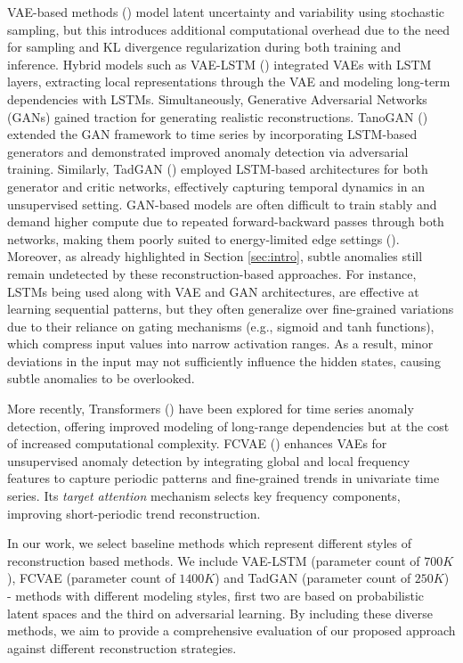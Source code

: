 VAE-based methods (\cite{vae,cvae,tsvae}) model latent uncertainty and variability using stochastic sampling, but this introduces additional computational overhead due to the need for sampling and KL divergence regularization during both training and inference.  Hybrid models such as
VAE-LSTM (\cite{tsvae}) integrated VAEs with LSTM layers, extracting local representations through the VAE and modeling
long-term dependencies with LSTMs. 
Simultaneously, Generative Adversarial Networks (GANs) gained traction for
generating realistic reconstructions. TanoGAN (\cite{tanogan}) extended the GAN framework to time series by incorporating
LSTM-based generators and demonstrated improved anomaly detection via adversarial training. Similarly,
TadGAN (\cite{tadgan}) employed LSTM-based architectures for both generator and critic networks, effectively capturing
temporal dynamics in an unsupervised setting. GAN-based models are often difficult to train stably and demand higher compute due to repeated forward-backward passes through both networks, making them poorly suited to energy-limited edge settings (\cite{gans}). Moreover, as already highlighted in Section \ref{sec:intro}, subtle anomalies still remain undetected by these reconstruction-based approaches. For instance, LSTMs being used along  with VAE and GAN architectures, are effective at learning sequential patterns, but they often generalize over fine-grained variations due to their reliance on gating mechanisms (e.g., sigmoid and tanh functions), which compress input values into narrow activation ranges. As a result, minor deviations in the input may not sufficiently influence the hidden states, causing subtle anomalies to be overlooked. 

More recently, Transformers (\cite{transformer}) have been explored for
time series anomaly detection, offering improved modeling of long-range dependencies but at the cost of increased
computational complexity. FCVAE (\cite{fcvae}) enhances VAEs for unsupervised anomaly detection by integrating global
and local frequency features to capture periodic patterns and fine-grained trends in univariate time series. Its {\em
target attention} mechanism selects key frequency components, improving short-periodic trend reconstruction. 

In our work, we select baseline methods which represent different styles of
reconstruction based methods. We include VAE-LSTM (parameter count of $700K$), FCVAE (parameter count of $1400K$) and TadGAN (parameter count of $250K$) - methods with different modeling styles, first two are based on
probabilistic latent spaces and the third on adversarial learning. By including these diverse methods, we aim to provide a comprehensive evaluation of our proposed approach against different reconstruction strategies. 


